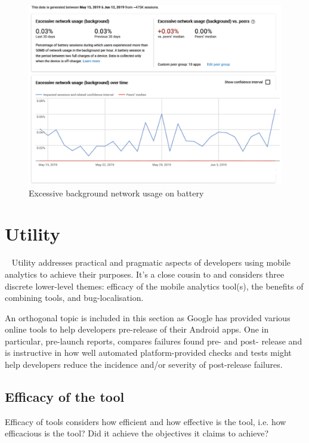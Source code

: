 \begin{figure}[!htbp]
    \centering
    \includegraphics[width=\textwidth, keepaspectratio]{images/android-vitals-screenshots/kiwix/Excessive_network_usage_by_kiwix_15_jun_2019.pdf}
    \caption{Excessive background network usage on battery}
    \label{fig:android_vitals_excessive_network_usage}
\end{figure}



\section{Utility}~\label{tata-utility-section}
Utility addresses practical and pragmatic aspects of developers using mobile analytics to achieve their purposes. It's a close cousin to  and considers three discrete lower-level themes: efficacy of the mobile analytics tool(s), the benefits of combining tools, and bug-localisation.

An orthogonal topic is included in this section as Google has provided various online tools to help developers pre-release of their Android apps. One in particular, pre-launch reports, compares failures found pre- and post- release and is instructive in how well automated platform-provided checks and tests might help developers reduce the incidence and/or severity of post-release failures.

\subsection{Efficacy of the tool}
Efficacy of tools considers how efficient and how effective is the tool, i.e. how efficacious is the tool? Did it achieve the objectives it claims to achieve?

